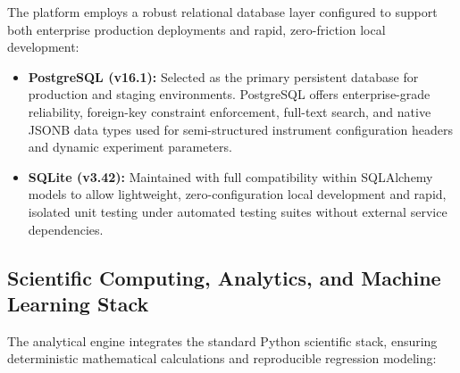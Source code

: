 \documentclass[12pt,a4paper,oneside]{report}
\begin{document}
{{{The platform employs a robust relational database layer configured to support both enterprise production deployments and rapid, zero-friction local development:

\begin{itemize}
    \item \textbf{PostgreSQL (v16.1):} Selected as the primary persistent database for production and staging environments. PostgreSQL offers enterprise-grade reliability, foreign-key constraint enforcement, full-text search, and native JSONB data types used for semi-structured instrument configuration headers and dynamic experiment parameters.
    \item \textbf{SQLite (v3.42):} Maintained with full compatibility within SQLAlchemy models to allow lightweight, zero-configuration local development and rapid, isolated unit testing under automated testing suites without external service dependencies.
\end{itemize}

\subsection{Scientific Computing, Analytics, and Machine Learning Stack}

The analytical engine integrates the standard Python scientific stack, ensuring deterministic mathematical calculations and reproducible regression modeling:

}}}
\end{document}
